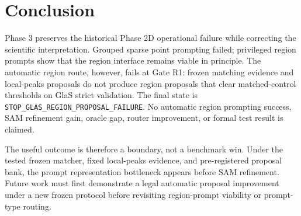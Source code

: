 \section{Conclusion}

Phase 3 preserves the historical Phase 2D operational failure while correcting the scientific interpretation. Grouped sparse point prompting failed; privileged region prompts show that the region interface remains viable in principle. The automatic region route, however, fails at Gate R1: frozen matching evidence and local-peaks proposals do not produce region proposals that clear matched-control thresholds on GlaS strict validation. The final state is \texttt{STOP\_GLAS\_REGION\_PROPOSAL\_FAILURE}. No automatic region prompting success, SAM refinement gain, oracle gap, router improvement, or formal test result is claimed.

The useful outcome is therefore a boundary, not a benchmark win. Under the tested frozen matcher, fixed local-peaks evidence, and pre-registered proposal bank, the prompt representation bottleneck appears before SAM refinement. Future work must first demonstrate a legal automatic proposal improvement under a new frozen protocol before revisiting region-prompt viability or prompt-type routing.
